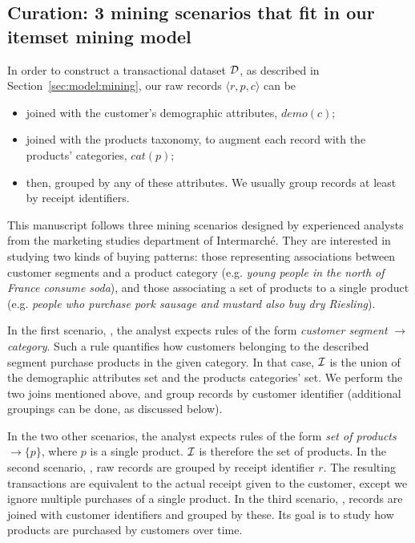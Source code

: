 \subsection{Curation: 3 mining scenarios that fit in our itemset mining model}
\label{sec:scenarios}

In order to construct a transactional dataset $\cal D$,
as described in Section~\ref{sec:model:mining},
our raw records $\langle r, p, c \rangle$ can be

\begin{itemize}
	\item joined with the customer's demographic attributes, $\mathit{demo}(c)$;
	\item joined with the products taxonomy,
		to augment each record with the products' categories, $\mathit{cat}(p)$;
	\item then, grouped by any of these attributes.
	We usually group records at least by receipt identifiers.
\end{itemize}

This manuscript follows three mining scenarios designed by experienced analysts
from the marketing studies department of Intermarch\'e.
They are interested in studying two kinds of buying patterns:
those representing associations between customer segments and a product category
(e.g. {\em young people in the north of France consume soda}),
and those associating a set of products to a single product
(e.g. {\em people who purchase pork sausage and mustard also buy dry Riesling}).

In the first scenario, \demoassoc,
the analyst expects rules of the form {\em customer segment} $\rightarrow$ {\em category}.
Such a rule quantifies how customers belonging to the described segment purchase products in the given category.
In that case, ${\cal I}$ is the union of the demographic attributes set and the products categories' set.
We perform the two joins mentioned above, and group records by customer identifier
(additional groupings can be done, as discussed below).

In the two other scenarios, the analyst expects rules of the form {\em set of products} $\rightarrow \{p\}$,
where $p$ is a single product.
$\cal I$ is therefore the set of products.
In the second scenario, \prodassocreceipt, raw records are grouped by receipt identifier $r$.
The resulting transactions are equivalent to the actual receipt given to the customer,
except we ignore multiple purchases of a single product.
In the third scenario, \prodassocclient, records are joined with customer identifiers and grouped by these.
Its goal is to study how products are purchased by customers over time.

